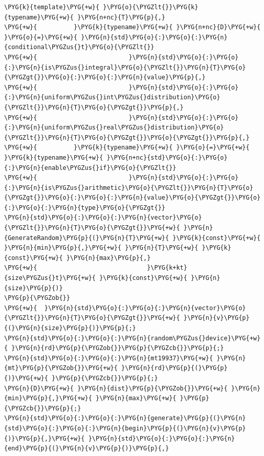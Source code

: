 \begin{itemize}
\begin{codeblockbg}
\begin{Verbatim}[commandchars=\\\{\},breaklines=true,breakanywhere=true,fontsize=\codefont,xleftmargin=17bp]
\PYG{k}{template}\PYG{+w}{ }\PYG{o}{\PYGZlt{}}\PYG{k}{typename}\PYG{+w}{ }\PYG{n+nc}{T}\PYG{p}{,}
\PYG{+w}{          }\PYG{k}{typename}\PYG{+w}{ }\PYG{n+nc}{D}\PYG{+w}{ }\PYG{o}{=}\PYG{+w}{ }\PYG{n}{std}\PYG{o}{:}\PYG{o}{:}\PYG{n}{conditional\PYGZus{}t}\PYG{o}{\PYGZlt{}}
\PYG{+w}{                         }\PYG{n}{std}\PYG{o}{:}\PYG{o}{:}\PYG{n}{is\PYGZus{}integral}\PYG{o}{\PYGZlt{}}\PYG{n}{T}\PYG{o}{\PYGZgt{}}\PYG{o}{:}\PYG{o}{:}\PYG{n}{value}\PYG{p}{,}
\PYG{+w}{                         }\PYG{n}{std}\PYG{o}{:}\PYG{o}{:}\PYG{n}{uniform\PYGZus{}int\PYGZus{}distribution}\PYG{o}{\PYGZlt{}}\PYG{n}{T}\PYG{o}{\PYGZgt{}}\PYG{p}{,}
\PYG{+w}{                         }\PYG{n}{std}\PYG{o}{:}\PYG{o}{:}\PYG{n}{uniform\PYGZus{}real\PYGZus{}distribution}\PYG{o}{\PYGZlt{}}\PYG{n}{T}\PYG{o}{\PYGZgt{}}\PYG{o}{\PYGZgt{}}\PYG{p}{,}
\PYG{+w}{          }\PYG{k}{typename}\PYG{+w}{ }\PYG{o}{=}\PYG{+w}{ }\PYG{k}{typename}\PYG{+w}{ }\PYG{n+nc}{std}\PYG{o}{:}\PYG{o}{:}\PYG{n}{enable\PYGZus{}if}\PYG{o}{\PYGZlt{}}
\PYG{+w}{                         }\PYG{n}{std}\PYG{o}{:}\PYG{o}{:}\PYG{n}{is\PYGZus{}arithmetic}\PYG{o}{\PYGZlt{}}\PYG{n}{T}\PYG{o}{\PYGZgt{}}\PYG{o}{:}\PYG{o}{:}\PYG{n}{value}\PYG{o}{\PYGZgt{}}\PYG{o}{:}\PYG{o}{:}\PYG{n}{type}\PYG{o}{\PYGZgt{}}
\PYG{n}{std}\PYG{o}{:}\PYG{o}{:}\PYG{n}{vector}\PYG{o}{\PYGZlt{}}\PYG{n}{T}\PYG{o}{\PYGZgt{}}\PYG{+w}{ }\PYG{n}{GenerateRandom}\PYG{p}{(}\PYG{n}{T}\PYG{+w}{ }\PYG{k}{const}\PYG{+w}{ }\PYG{n}{min}\PYG{p}{,}\PYG{+w}{ }\PYG{n}{T}\PYG{+w}{ }\PYG{k}{const}\PYG{+w}{ }\PYG{n}{max}\PYG{p}{,}
\PYG{+w}{                              }\PYG{k+kt}{size\PYGZus{}t}\PYG{+w}{ }\PYG{k}{const}\PYG{+w}{ }\PYG{n}{size}\PYG{p}{)}
\PYG{p}{\PYGZob{}}
\PYG{+w}{  }\PYG{n}{std}\PYG{o}{:}\PYG{o}{:}\PYG{n}{vector}\PYG{o}{\PYGZlt{}}\PYG{n}{T}\PYG{o}{\PYGZgt{}}\PYG{+w}{ }\PYG{n}{v}\PYG{p}{(}\PYG{n}{size}\PYG{p}{)}\PYG{p}{;}
\PYG{n}{std}\PYG{o}{:}\PYG{o}{:}\PYG{n}{random\PYGZus{}device}\PYG{+w}{ }\PYG{n}{rd}\PYG{p}{\PYGZob{}}\PYG{p}{\PYGZcb{}}\PYG{p}{;}
\PYG{n}{std}\PYG{o}{:}\PYG{o}{:}\PYG{n}{mt19937}\PYG{+w}{ }\PYG{n}{mt}\PYG{p}{\PYGZob{}}\PYG{+w}{ }\PYG{n}{rd}\PYG{p}{(}\PYG{p}{)}\PYG{+w}{ }\PYG{p}{\PYGZcb{}}\PYG{p}{;}
\PYG{n}{D}\PYG{+w}{ }\PYG{n}{dist}\PYG{p}{\PYGZob{}}\PYG{+w}{ }\PYG{n}{min}\PYG{p}{,}\PYG{+w}{ }\PYG{n}{max}\PYG{+w}{ }\PYG{p}{\PYGZcb{}}\PYG{p}{;}
\PYG{n}{std}\PYG{o}{:}\PYG{o}{:}\PYG{n}{generate}\PYG{p}{(}\PYG{n}{std}\PYG{o}{:}\PYG{o}{:}\PYG{n}{begin}\PYG{p}{(}\PYG{n}{v}\PYG{p}{)}\PYG{p}{,}\PYG{+w}{ }\PYG{n}{std}\PYG{o}{:}\PYG{o}{:}\PYG{n}{end}\PYG{p}{(}\PYG{n}{v}\PYG{p}{)}\PYG{p}{,}

\end{Verbatim}
\end{codeblockbg}
\end{itemize}
